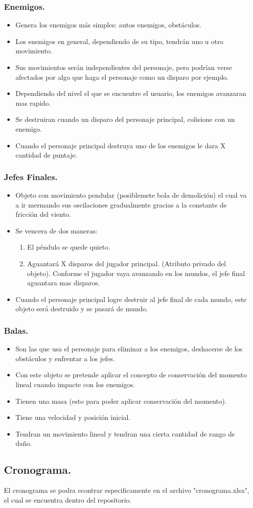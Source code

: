 \documentclass{article}
\begin{document}
\subsubsection{Enemigos.}
\begin{itemize}
    \item Genera los enemigos más simples: autos enemigos, obstáculos.
    \item Los enemigos en general, dependiendo de su tipo, tendrán uno u otro movimiento.
    \item Sus movimientos serán independientes del personaje, pero podrían verse afectados por algo que haga el personaje como un disparo por ejemplo.
    \item Dependiendo del nivel el que se encuentre el usuario, los enemigos avanzaran mas rapido.
    \item Se destruiran cuando un disparo del personaje principal, colisione con un enemigo.
    \item Cuando el personaje principal destruya uno de los enemigos le dara X cantidad de puntaje.
\end{itemize}
\subsubsection{Jefes Finales.}
\begin{itemize}
    \item Objeto con movimiento pendular (posiblemete bola de demolición) el cual va a ir mermando sus oscilaciones gradualmente gracias a la constante de fricción del viento.
    \item Se vencera de dos maneras:
    \begin{enumerate}
        \item El péndulo se quede quieto.
        \item Aguantará X disparos del jugador principal. (Atributo privado del objeto).
        Conforme el jugador vaya avanzando en los mundos, el jefe final aguantara mas disparos.
    \end{enumerate}
    \item Cuando el personaje principal logre destruir al jefe final de cada mundo, este objeto será destruido y se pasará de mundo.
\end{itemize}
\subsubsection{Balas.}
\begin{itemize}
    \item Son las que usa el personaje para eliminar a los enemigos, deshacerse de los obstáculos y enfrentar a los jefes. 
    \item Con este objeto se pretende aplicar el concepto de conservación  del momento lineal cuando impacte con los enemigos.
    \item Tienen una masa (esto para poder aplicar conservación del momento). 
    \item Tiene una velocidad y posición inicial.
    \item Tendran un movimiento lineal y tendran una cierta cantidad de rango de daño.
\end{itemize}
\subsection{Cronograma.}
El cronograma se podra econtrar especificamente en el archivo "cronograma.xlsx", el cual se encuentra dentro del repositorio.


\end{document}

